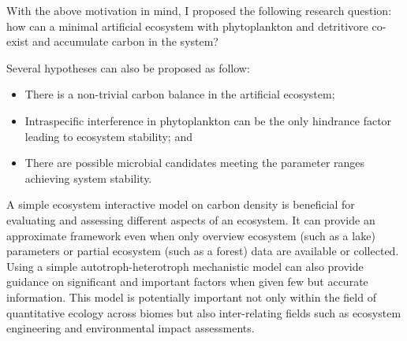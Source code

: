 \documentclass[../thesis.tex]{subfiles} %
\begin{document}
With the above motivation in mind, I proposed the following research question: how can a minimal artificial ecosystem with phytoplankton and detritivore co-exist and accumulate carbon in the system?

Several hypotheses can also be proposed as follow:
\begin{itemize}
    \item There is a non-trivial carbon balance in the artificial ecosystem;
    \item Intraspecific interference in phytoplankton can be the only hindrance factor leading to ecosystem stability; and
    \item There are possible microbial candidates meeting the parameter ranges achieving system stability.
\end{itemize}

A simple ecosystem interactive model on carbon density is beneficial for evaluating and assessing different aspects of an ecosystem.  It can provide an approximate framework even when only overview ecosystem (such as a lake) parameters or partial ecosystem (such as a forest) data are available or collected.  Using a simple autotroph-heterotroph mechanistic model can also provide guidance on significant and important factors when given few but accurate information.  This model is potentially important not only within the field of quantitative ecology across biomes but also inter-relating fields such as ecosystem engineering and environmental impact assessments.
\end{document}
